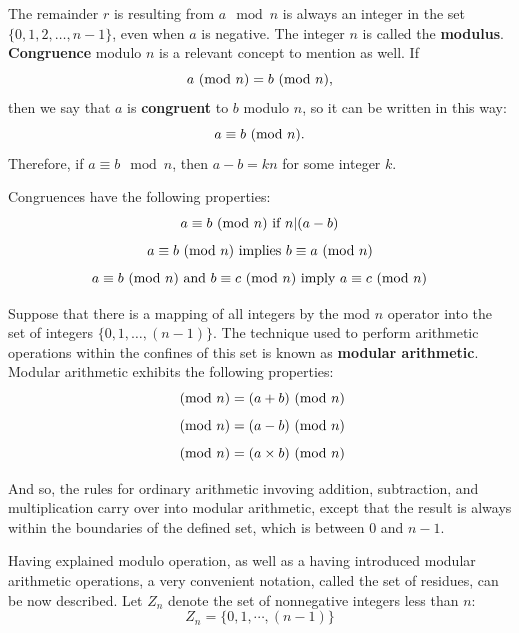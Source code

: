 The remainder $r$ is resulting from $a \mod n$ is always an integer in the set $\{0, 1, 2, \dots, n-1\}$, even when $a$ is negative. The integer $n$ is called the \textbf{modulus}. 
\noindent \textbf{Congruence} modulo $n$ is a relevant concept to mention as well. If
\begin{equation}
  a \ (\text{mod}\ n) = b \ (\text{mod}\ n),
\end{equation}
\noindent then we say that $a$ is \textbf{congruent} to $b$ modulo $n$, so it can be written in this way:
\begin{equation}
a \equiv b \ (\text{mod}\ n).
\end{equation}
Therefore, if $a \equiv b \mod n$, then $a-b=kn$ for some integer $k$. 

Congruences have the following properties:
\begin{equation}
  a \equiv b \ (\text{mod}\ n) \text{ if } n|(a-b)
\end{equation}
\begin{equation}
  a \equiv b \ (\text{mod}\ n) \text{ implies } b \equiv a \ (\text{mod}\ n)
\end{equation}
\begin{equation}
  a \equiv b \ (\text{mod}\ n) \text{ and } b \equiv c \ (\text{mod}\ n) \text{ imply } a \equiv c \ (\text{mod}\ n)
\end{equation}

Suppose that there is a mapping of all integers by the mod $n$ operator into the set of integers $\{0, 1, \dots, (n-1)\}$. The technique used to perform arithmetic operations within the confines of this set is known as \textbf{modular arithmetic}. Modular arithmetic exhibits the following properties:
\begin{equation}
  [(a \Mod{n}) + (b \Mod{n})] \Mod{n} = (a + b) \Mod{n}
\end{equation}
\begin{equation}
  [(a \Mod{n}) - (b \Mod{n})] \Mod{n} = (a - b) \Mod{n}
\end{equation}
\begin{equation}
  [(a \Mod{n}) \times (b \Mod{n})] \Mod{n} = (a \times b) \Mod{n}
\end{equation}

And so, the rules for ordinary arithmetic invoving addition, subtraction, and multiplication carry over into modular arithmetic, except that the result is always within the boundaries of the defined set, which is between 0 and $n-1$.

Having explained modulo operation, as well as a having introduced modular arithmetic operations, a very convenient notation, called the set of residues, can be now described. Let $Z_{n}$ denote the set of nonnegative integers less than $n$:
\begin{equation}
Z_{n} = \{0,1,\cdots, (n-1)\}
\end{equation}

